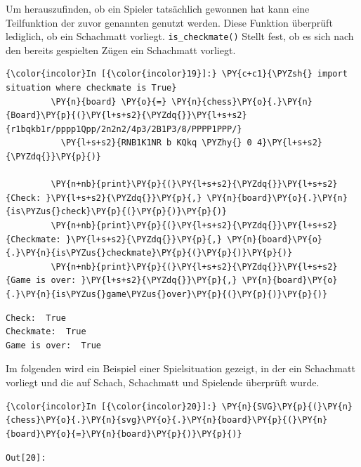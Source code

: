 Um herauszufinden, ob ein Spieler tatsächlich gewonnen hat kann eine
Teilfunktion der zuvor genannten genutzt werden. Diese Funktion
überprüft lediglich, ob ein Schachmatt vorliegt.
\texttt{is\_checkmate()} Stellt fest, ob es sich nach den bereits
gespielten Zügen ein Schachmatt vorliegt.

    \begin{Verbatim}[commandchars=\\\{\}]
{\color{incolor}In [{\color{incolor}19}]:} \PY{c+c1}{\PYZsh{} import situation where checkmate is True}
         \PY{n}{board} \PY{o}{=} \PY{n}{chess}\PY{o}{.}\PY{n}{Board}\PY{p}{(}\PY{l+s+s2}{\PYZdq{}}\PY{l+s+s2}{r1bqkb1r/pppp1Qpp/2n2n2/4p3/2B1P3/8/PPPP1PPP/}
		   \PY{l+s+s2}{RNB1K1NR b KQkq \PYZhy{} 0 4}\PY{l+s+s2}{\PYZdq{}}\PY{p}{)}
         
         \PY{n+nb}{print}\PY{p}{(}\PY{l+s+s2}{\PYZdq{}}\PY{l+s+s2}{Check: }\PY{l+s+s2}{\PYZdq{}}\PY{p}{,} \PY{n}{board}\PY{o}{.}\PY{n}{is\PYZus{}check}\PY{p}{(}\PY{p}{)}\PY{p}{)}
         \PY{n+nb}{print}\PY{p}{(}\PY{l+s+s2}{\PYZdq{}}\PY{l+s+s2}{Checkmate: }\PY{l+s+s2}{\PYZdq{}}\PY{p}{,} \PY{n}{board}\PY{o}{.}\PY{n}{is\PYZus{}checkmate}\PY{p}{(}\PY{p}{)}\PY{p}{)}
         \PY{n+nb}{print}\PY{p}{(}\PY{l+s+s2}{\PYZdq{}}\PY{l+s+s2}{Game is over: }\PY{l+s+s2}{\PYZdq{}}\PY{p}{,} \PY{n}{board}\PY{o}{.}\PY{n}{is\PYZus{}game\PYZus{}over}\PY{p}{(}\PY{p}{)}\PY{p}{)}
\end{Verbatim}


    \begin{Verbatim}[commandchars=\\\{\}]
Check:  True
Checkmate:  True
Game is over:  True

    \end{Verbatim}

    Im folgenden wird ein Beispiel einer Spielsituation gezeigt, in der ein
Schachmatt vorliegt und die auf Schach, Schachmatt und Spielende
überprüft wurde.

    \begin{Verbatim}[commandchars=\\\{\}]
{\color{incolor}In [{\color{incolor}20}]:} \PY{n}{SVG}\PY{p}{(}\PY{n}{chess}\PY{o}{.}\PY{n}{svg}\PY{o}{.}\PY{n}{board}\PY{p}{(}\PY{n}{board}\PY{o}{=}\PY{n}{board}\PY{p}{)}\PY{p}{)}
\end{Verbatim}

\texttt{\color{outcolor}Out[{\color{outcolor}20}]:}
    
    \begin{center}
    \end{center}
    { \hspace*{\fill} \\}
    


